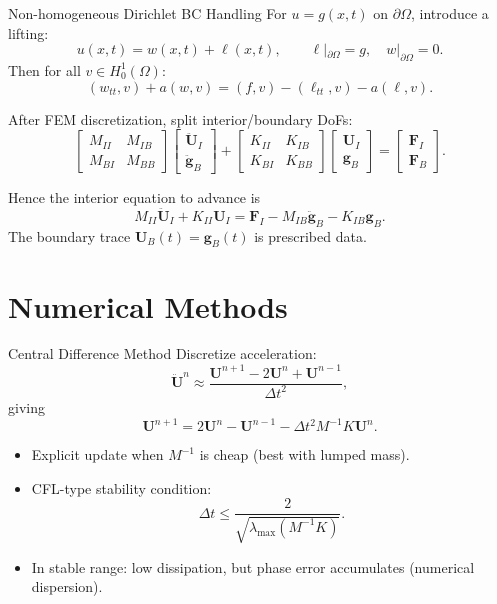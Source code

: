 \documentclass{beamer}
\begin{document}
\begin{frame}{Non-homogeneous Dirichlet BC Handling}
  For $u=g(x,t)$ on $\partial\Omega$, introduce a lifting:
  \[
    u(x,t)=w(x,t)+\ell(x,t),\qquad
    \ell|_{\partial\Omega}=g,\quad w|_{\partial\Omega}=0.
  \]
  Then for all $v\in H_0^1(\Omega)$:
  \[
    (w_{tt},v)+a(w,v)=(f,v)-(\ell_{tt},v)-a(\ell,v).
  \]

  After FEM discretization, split interior/boundary DoFs:
  \[
    \begin{bmatrix}M_{II} & M_{IB}\\ M_{BI} & M_{BB}\end{bmatrix}
    \begin{bmatrix}\ddot{\mathbf U}_I\\ \ddot{\mathbf g}_B\end{bmatrix}
    +
    \begin{bmatrix}K_{II} & K_{IB}\\ K_{BI} & K_{BB}\end{bmatrix}
    \begin{bmatrix}\mathbf U_I\\ \mathbf g_B\end{bmatrix}
    =
    \begin{bmatrix}\mathbf F_I\\ \mathbf F_B\end{bmatrix}.
  \]

  Hence the interior equation to advance is
  \[
    M_{II}\ddot{\mathbf U}_I + K_{II}\mathbf U_I
    = \mathbf F_I - M_{IB}\ddot{\mathbf g}_B - K_{IB}\mathbf g_B.
  \]
  The boundary trace $\mathbf U_B(t)=\mathbf g_B(t)$ is prescribed data.
\end{frame}

\section{Numerical Methods}

\begin{frame}{Central Difference Method}
  Discretize acceleration:
  \[
    \ddot{\mathbf U}^n \approx \frac{\mathbf U^{n+1}-2\mathbf U^n+\mathbf U^{n-1}}{\Delta t^2},
  \]
  giving
  \[
    \mathbf U^{n+1}=2\mathbf U^n-\mathbf U^{n-1}-\Delta t^2 M^{-1}K\mathbf U^n.
  \]

  \begin{itemize}
    \item Explicit update when $M^{-1}$ is cheap (best with lumped mass).
    \item CFL-type stability condition:
      \[
        \Delta t \le \frac{2}{\sqrt{\lambda_{\max}(M^{-1}K)}}.
      \]
    \item In stable range: low dissipation, but phase error accumulates
          (numerical dispersion).
  \end{itemize}
\end{frame}
\end{document}
